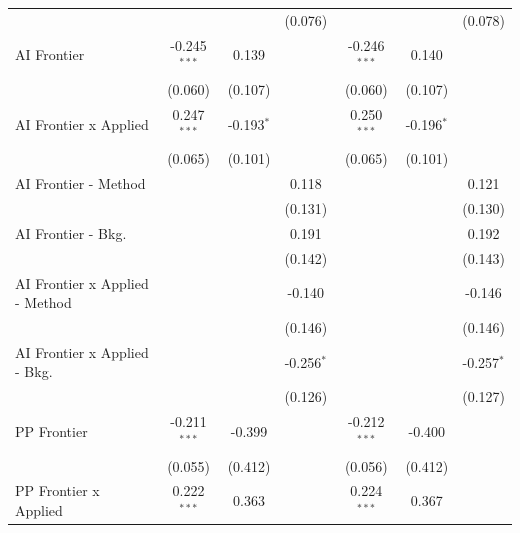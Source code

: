 \begin{tabular}{lcccccc}
                                  &                &              & (0.076)      &                &              & (0.078)\\   
   AI Frontier                    & -0.245$^{***}$ & 0.139        &              & -0.246$^{***}$ & 0.140        &   \\   
                                  & (0.060)        & (0.107)      &              & (0.060)        & (0.107)      &   \\   
   AI Frontier x Applied          & 0.247$^{***}$  & -0.193$^{*}$ &              & 0.250$^{***}$  & -0.196$^{*}$ &   \\   
                                  & (0.065)        & (0.101)      &              & (0.065)        & (0.101)      &   \\   
   AI Frontier - Method           &                &              & 0.118        &                &              & 0.121\\   
                                  &                &              & (0.131)      &                &              & (0.130)\\   
   AI Frontier - Bkg.             &                &              & 0.191        &                &              & 0.192\\   
                                  &                &              & (0.142)      &                &              & (0.143)\\   
   AI Frontier x Applied - Method &                &              & -0.140       &                &              & -0.146\\   
                                  &                &              & (0.146)      &                &              & (0.146)\\   
   AI Frontier x Applied - Bkg.   &                &              & -0.256$^{*}$ &                &              & -0.257$^{*}$\\   
                                  &                &              & (0.126)      &                &              & (0.127)\\   
   PP Frontier                    & -0.211$^{***}$ & -0.399       &              & -0.212$^{***}$ & -0.400       &   \\   
                                  & (0.055)        & (0.412)      &              & (0.056)        & (0.412)      &   \\   
   PP Frontier x Applied          & 0.222$^{***}$  & 0.363        &              & 0.224$^{***}$  & 0.367        &   \\   

\end{tabular}
